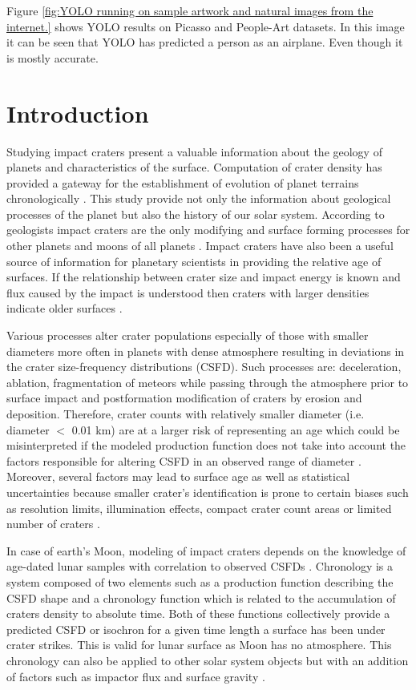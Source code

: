 \documentclass[11pt]{article}
\begin{document}
Figure \ref{fig:YOLO running on sample artwork and natural images from the internet.} shows YOLO results on Picasso and People-Art datasets. In this image it can be seen that YOLO has predicted a person as an airplane. Even though it is mostly accurate.
\fi

\section{Introduction}
Studying impact craters present a valuable information about the geology of planets and characteristics of the surface. Computation of crater density has provided a gateway for the establishment of evolution of planet terrains chronologically \cite{martins2009crater}. This study provide not only the information about geological processes of the planet but also the history of our solar system. According to geologists impact craters are the only modifying and surface forming processes for other planets and moons of all planets \cite{koeberl1994african}. Impact craters have also been a useful source of information for planetary scientists in providing the relative age of surfaces. If the relationship between crater size and impact energy is known and flux caused by the impact is understood then craters with larger densities indicate older surfaces \cite{ivanov2002comparison}.

Various processes alter crater populations especially of those with smaller diameters \cite{opik1965mariner} more often in planets with dense atmosphere resulting in deviations in the crater size-frequency distributions (CSFD). Such processes are: deceleration, ablation, fragmentation of meteors while passing through the atmosphere prior to surface impact and postformation modification of craters by erosion and deposition. Therefore, crater counts with relatively smaller diameter (i.e. diameter $<$ 0.01 km) are at a larger risk of representing an age which could be misinterpreted if the modeled production function does not take into account the factors responsible for altering CSFD in an observed range of diameter \cite{hartmann1981chronology}. Moreover, several factors may lead to surface age as well as statistical uncertainties because smaller crater's identification is prone to certain biases such as resolution limits, illumination effects, compact crater count areas or limited number of craters \cite{soderblom1970distribution}.

In case of earth's Moon, modeling of impact craters depends on the knowledge of age-dated lunar samples with correlation to observed CSFDs \cite{williams2018dating}. Chronology is a system composed of two elements such as a production function describing the CSFD shape and a chronology function which is related to the accumulation of craters density to absolute time. Both of these functions collectively provide a predicted CSFD or isochron for a given time length a surface has been under crater strikes. This is valid for lunar surface as Moon has no atmosphere. This chronology can also be applied to other solar system objects but with an addition of factors such as impactor flux and surface gravity \cite{ivanov2002comparison}.
\end{document}
